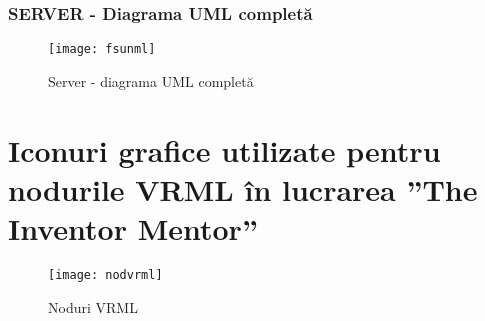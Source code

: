 \subsection*{SERVER - Diagrama UML completă}
\begin{figure}[h]
    \centering
    \texttt{[image: fsunml]}
    \caption{Server - diagrama UML completă}
    \label{fig:imagSrvUML}
\end{figure}
\newpage
\chapter{Iconuri grafice utilizate pentru nodurile VRML în lucrarea ”The Inventor Mentor”}
\begin{figure}[h]
    \centering
    \texttt{[image: nodvrml]}
    \caption{Noduri VRML}
    \label{fig:imagSrvUML}
\end{figure}
